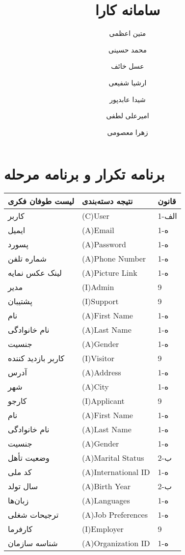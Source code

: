 \documentclass[12pt]{article}
\author{متین اعظمی}
\author{محمد حسینی}
\author{عسل خائف}
\author{ارشیا شفیعی}
\author{شیدا عابدپور}
\author{امیرعلی لطفی}
\author{زهرا معصومی}
\title{سامانه کارا}
\begin{document}
	
	\section{برنامه تکرار و برنامه مرحله}
	
	\begin{center}
		\begin{table}[]
			\begin{tabular}{|l|l|l|}
				\hline
				لیست طوفان فکری & نتیجه دسته‌بندی & قانون \\
				\hline
				کاربر & (C)User & 1-الف \\
				\hline
				ایمیل & (A)Email & 1-ه  \\
				\hline
				پسورد & (A)Password & 1-ه   \\
				\hline
				شماره تلفن & (A)Phone Number & 1-ه   \\
				\hline
				لینک عکس نمایه & (A)Picture Link & 1-ه   \\
				\hline
				مدیر & (I)Admin & 9     \\
				\hline
				پشتیبان & (I)Support & 9     \\
				\hline
				نام & (A)First Name & 1-ه   \\
				\hline
				نام خانوادگی & (A)Last Name & 1-ه   \\
				\hline
				جنسیت & (A)Gender & 1-ه   \\
				\hline
				کاربر بازدید کننده & (I)Visitor & 9     \\
				\hline
				آدرس & (A)Address & 1-ه   \\
				\hline
				شهر & (A)City & 1-ه   \\
				\hline
				کارجو & (I)Applicant & 9     \\
				\hline
				نام & (A)First Name & 1-ه   \\
				\hline
				نام خانوادگی & (A)Last Name & 1-ه   \\
				\hline
				جنسیت & (A)Gender & 1-ه   \\
				\hline
				وضعیت تأهل & (A)Marital Status & 2-ب   \\
				\hline
				کد ملی & (A)International ID & 1-ه   \\
				\hline
				سال تولد & (A)Birth Year & 2-ب   \\
				\hline
				زبان‌ها & (A)Languages & 1-ه   \\
				\hline
				ترجیحات شغلی & (A)Job Preferences & 1-ه   \\
				\hline
				کارفرما & (I)Employer & 9     \\
				\hline
				شناسه سازمان & (A)Organization ID & 1-ه   \\

\end{tabular}
\end{table}
\end{center}
\end{document}
